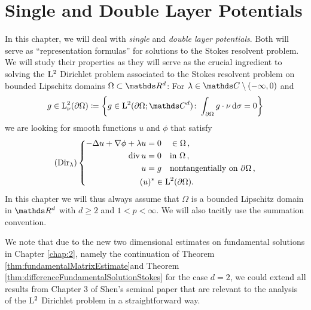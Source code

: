 \chapter{Single and Double Layer Potentials}
\label{chap:3}

In this chapter, we will deal with \emph{single} and \emph{double layer potentials}.
Both will serve as ``representation formulas'' for solutions to the Stokes resolvent problem.
We will study their properties as they will serve as the crucial ingredient to solving the $\mathrm{L}^2$ Dirichlet problem associated to the Stokes resolvent problem on bounded Lipschitz domains $\Omega \subset \R^d$:
For $\lambda \in \C \setminus (-\infty,0)$ and
\begin{align*}
  g \in \Ell^2_\nu(\partial\Omega) \coloneqq \bigg\{g \in \Ell^2(\partial\Omega; \C^d) \colon \int_{\partial\Omega} g \cdot \nu \d \sigma = 0\bigg\}
\end{align*}
we are looking for smooth functions $u$ and $\phi$ that satisfy
{
  \label{eq:dirProblem}
\begin{align*}
  (\mathrm{Dir}_\lambda)
  \left\{
  \begin{alignedat}{1}
    -\Delta u + \nabla \phi + \lambda u =&\; 0 \quad\in\Omega\,, \\
    \mathrm{div\,} u =&\; 0 \quad\text{in } \Omega\,, \\ 
    u =&\; g  \quad\text{nontangentially on } \partial\Omega\,, \\
    (u)^* &\in \mathrm{L}^2(\partial\Omega).
  \end{alignedat}
    \right.
\end{align*}
}
In this chapter we will thus always assume that $\Omega$ is a bounded Lipschitz domain in $\R^d$ with $d \geq 2$ and $1 < p < \infty$.
We will also tacitly use the summation convention.

We note that due to the new two dimensional estimates on fundamental solutions in Chapter \ref{chap:2}, namely the continuation of  Theorem \ref{thm:fundamentalMatrixEstimate}and Theorem \ref{thm:differenceFundamentalSolutionStokes} for the case $d=2$, we could extend all results from Chapter 3 of Shen's seminal paper \cite{Shen2012} that are relevant to the analysis of the $\mathrm{L}^2$ Dirichlet problem in a straightforward way.

